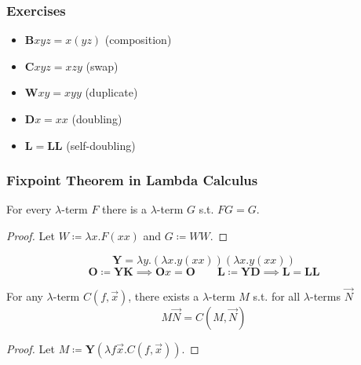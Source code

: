 \documentclass[UTF8,aspectratio=43,11pt,colorlinks,compress,openany]{beamer}%
\begin{document}
\begin{frame}\frametitle{Exercises}
\begin{itemize}
	\item $\mathbf{B}xyz=x(yz)$ (composition)
	\item $\mathbf{C}xyz=xzy$ (swap)
	\item $\mathbf{W}xy=xyy$ (duplicate)
	\item $\mathbf{D}x=xx$ (doubling)
	\item $\mathbf{L}=\mathbf{L}\mathbf{L}$ (self-doubling)
\end{itemize}
\end{frame}

\begin{frame}\frametitle{Fixpoint Theorem in Lambda Calculus}
\setlength\abovedisplayskip{0pt}
\setlength\belowdisplayskip{0pt}
\begin{theorem}
	For every $\lambda$-term $F$ there is a $\lambda$-term $G$ s.t. $FG=G$.
\end{theorem}
\begin{proof}
Let $W\coloneqq \lambda x.F(xx)$ and $G\coloneqq WW$.
\end{proof}
\[\mathbf{Y}=\lambda y.(\lambda x.y(xx))(\lambda x.y(xx))\]
\[\mathbf{O}\coloneqq \mathbf{Y}\mathbf{K}\implies \mathbf{O}x=\mathbf{O}\qquad \mathbf{L}\coloneqq \mathbf{Y}\mathbf{D}\implies \mathbf{L}=\mathbf{L}\mathbf{L}\]
\begin{corollary}
For any $\lambda$-term $C(f,\vec{x})$, there exists a $\lambda$-term $M$ s.t. for all $\lambda$-terms $\vec{N}$
\[M\vec{N}=C(M,\vec{N})\]
\end{corollary}
\begin{proof}
Let $M\coloneqq \mathbf{Y}(\lambda f\vec{x}.C(f,\vec{x}))$.
\end{proof}
\end{frame}
\end{document}
